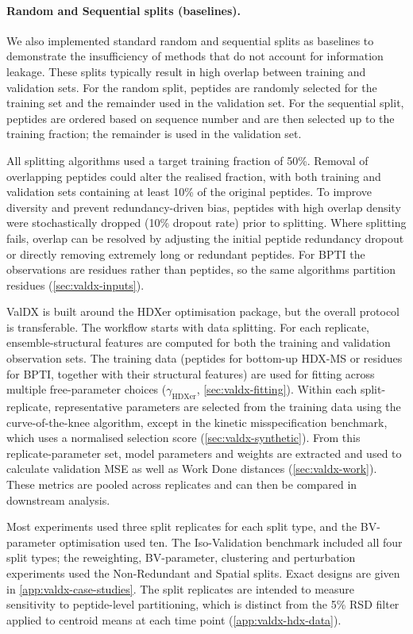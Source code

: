 \paragraph{Random and Sequential splits (baselines).}
We also implemented standard random and sequential splits as baselines to demonstrate the insufficiency of methods that do not account for information leakage. These splits typically result in high overlap between training and validation sets. For the random split, peptides are randomly selected for the training set and the remainder used in the validation set. For the sequential split, peptides are ordered based on sequence number and are then selected up to the training fraction; the remainder is used in the validation set.

All splitting algorithms used a target training fraction of 50\%. Removal of overlapping peptides could alter the realised fraction, with both training and validation sets containing at least 10\% of the original peptides. To improve diversity and prevent redundancy-driven bias, peptides with high overlap density were stochastically dropped (10\% dropout rate) prior to splitting. Where splitting fails, overlap can be resolved by adjusting the initial peptide redundancy dropout or directly removing extremely long or redundant peptides. For BPTI the observations are residues rather than peptides, so the same algorithms partition residues (\cref{sec:valdx-inputs}).

ValDX is built around the HDXer optimisation package,\supercite{bradshawInterpretationHDXData2020} but the overall protocol is transferable. The workflow starts with data splitting. For each replicate, ensemble-structural features are computed for both the training and validation observation sets. The training data (peptides for bottom-up HDX-MS or residues for BPTI, together with their structural features) are used for fitting across multiple free-parameter choices ($\gamma_\text{HDXer}$, \cref{sec:valdx-fitting}). Within each split-replicate, representative parameters are selected from the training data using the curve-of-the-knee algorithm, except in the kinetic misspecification benchmark, which uses a normalised selection score (\cref{sec:valdx-synthetic}). From this replicate-parameter set, model parameters and weights are extracted and used to calculate validation MSE as well as Work Done distances (\cref{sec:valdx-work}). These metrics are pooled across replicates and can then be compared in downstream analysis.

Most experiments used three split replicates for each split type, and the BV-parameter optimisation used ten. The Iso-Validation benchmark included all four split types; the reweighting, BV-parameter, clustering and perturbation experiments used the Non-Redundant and Spatial splits. Exact designs are given in \cref{app:valdx-case-studies}. The split replicates are intended to measure sensitivity to peptide-level partitioning, which is distinct from the 5\% RSD filter applied to centroid means at each time point (\cref{app:valdx-hdx-data}).

